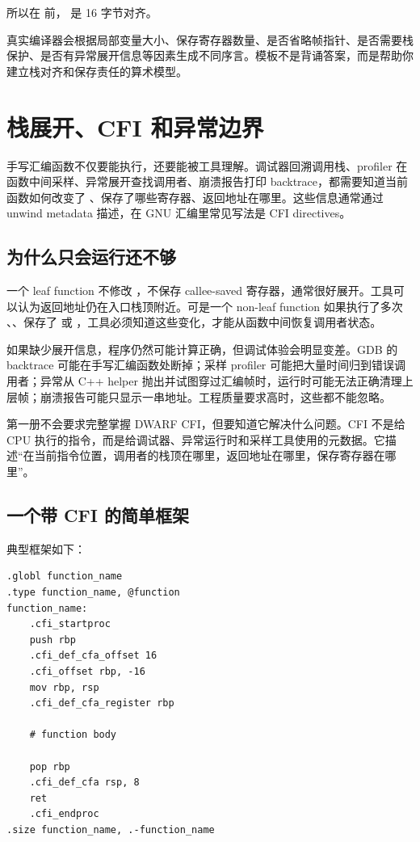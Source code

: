 所以在   前， 是 16 字节对齐。

\begin{deepdive}
真实编译器会根据局部变量大小、保存寄存器数量、是否省略帧指针、是否需要栈保护、是否有异常展开信息等因素生成不同序言。模板不是背诵答案，而是帮助你建立栈对齐和保存责任的算术模型。
\end{deepdive}

\section{栈展开、CFI 和异常边界}

手写汇编函数不仅要能执行，还要能被工具理解。调试器回溯调用栈、profiler 在函数中间采样、异常展开查找调用者、崩溃报告打印 backtrace，都需要知道当前函数如何改变了 、保存了哪些寄存器、返回地址在哪里。这些信息通常通过 unwind metadata 描述，在 GNU 汇编里常见写法是 CFI directives。

\subsection{为什么只会运行还不够}

一个 leaf function 不修改 ，不保存 callee-saved 寄存器，通常很好展开。工具可以认为返回地址仍在入口栈顶附近。可是一个 non-leaf function 如果执行了多次 、、保存了  或 ，工具必须知道这些变化，才能从函数中间恢复调用者状态。

如果缺少展开信息，程序仍然可能计算正确，但调试体验会明显变差。GDB 的 backtrace 可能在手写汇编函数处断掉；采样 profiler 可能把大量时间归到错误调用者；异常从 C++ helper 抛出并试图穿过汇编帧时，运行时可能无法正确清理上层帧；崩溃报告可能只显示一串地址。工程质量要求高时，这些都不能忽略。

第一册不会要求完整掌握 DWARF CFI，但要知道它解决什么问题。CFI 不是给 CPU 执行的指令，而是给调试器、异常运行时和采样工具使用的元数据。它描述“在当前指令位置，调用者的栈顶在哪里，返回地址在哪里，保存寄存器在哪里”。

\subsection{一个带 CFI 的简单框架}

典型框架如下：

\begin{lstlisting}
.globl function_name
.type function_name, @function
function_name:
    .cfi_startproc
    push rbp
    .cfi_def_cfa_offset 16
    .cfi_offset rbp, -16
    mov rbp, rsp
    .cfi_def_cfa_register rbp

    # function body

    pop rbp
    .cfi_def_cfa rsp, 8
    ret
    .cfi_endproc
.size function_name, .-function_name
\end{lstlisting}

